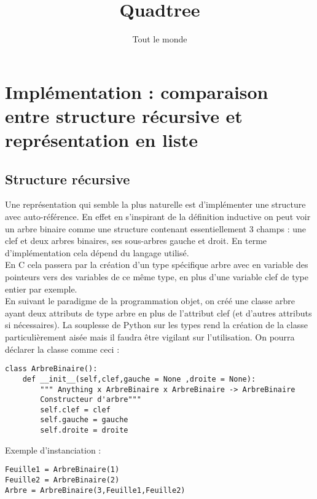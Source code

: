 \documentclass{article}
\title{Quadtree}
\author{Tout le monde}
\begin{document}
\maketitle

\newpage

\tableofcontents

\section{Implémentation : comparaison entre structure récursive et représentation en liste}
\subsection{Structure récursive}
Une représentation qui semble la plus naturelle est d'implémenter une structure avec auto-référence. En effet en s'inspirant de la définition inductive on peut voir un arbre binaire comme une structure contenant essentiellement 3 champs : une clef et deux arbres binaires, ses sous-arbres gauche et droit. 
En terme d'implémentation cela dépend du langage utilisé. \\
 En C cela passera par la création d'un type spécifique arbre avec en variable des pointeurs vers des variables de ce même type, en plus d'une variable clef de type entier par exemple. \\
En suivant le paradigme de la programmation objet, on créé une classe arbre ayant deux attributs de type arbre en plus de l'attribut clef (et d'autres attributs si nécessaires). La souplesse de Python sur les types rend la création de la classe particulièrement aisée mais il faudra être vigilant sur l'utilisation. 
On pourra déclarer la classe comme ceci :

\begin{lstlisting}
class ArbreBinaire():
    def __init__(self,clef,gauche = None ,droite = None):
        """ Anything x ArbreBinaire x ArbreBinaire -> ArbreBinaire
        Constructeur d'arbre"""
        self.clef = clef
        self.gauche = gauche
        self.droite = droite
\end{lstlisting}

Exemple d'instanciation :

\begin{lstlisting}
Feuille1 = ArbreBinaire(1)
Feuille2 = ArbreBinaire(2)
Arbre = ArbreBinaire(3,Feuille1,Feuille2)
\end{lstlisting}
\end{document}
